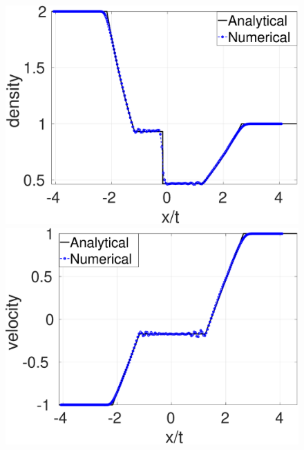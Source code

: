 \begin{figure}
    \centering
    \begin{minipage}{.495\textwidth}
        \centering
        \includegraphics[width=0.99 \textwidth]{Chapter-4/Figures/double_exp/Dexp-RCM-rho}
    \end{minipage}%
    \begin{minipage}{.495 \textwidth}
        \centering
        \includegraphics[width=0.99 \textwidth]{Chapter-4/Figures/double_exp/Dexp-RCM-v}
    \end{minipage}%
    \\
    \begin{minipage}{.495\textwidth}
        \centering

\end{minipage}
\end{figure}
